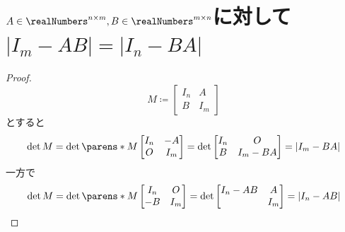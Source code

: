     \section{\texorpdfstring{$A\in\realNumbers^{n\times m}, B\in\realNumbers^{m\times n}$}{A∈R\string^(n×m), B∈R\string^(m×n)}に対して\texorpdfstring{$|I_m-AB| = |I_n-BA|$}{|Im-AB| = |In-BA|}}
        \label{I-ABの行列式}
        \begin{proof}
            \[
                M \coloneq \begin{bmatrix}
                    I_n & A \\
                    B & I_m
                \end{bmatrix}
            \]
            とすると
            \[
                \det{M} = \det{
                    \parens*{M
                    \begin{bmatrix}
                        I_n & -A \\
                        O & I_m
                    \end{bmatrix}
                    }
                } = \det{
                    \begin{bmatrix}
                        I_n & O \\
                        B & I_m-BA
                    \end{bmatrix}
                } = |I_m-BA|
            \]
            一方で
            \[
                \det{M} = \det{
                    \parens*{M
                    \begin{bmatrix}
                        I_n & O \\
                        -B & I_m
                    \end{bmatrix}
                    }
                } = \det{
                    \begin{bmatrix}
                        I_n-AB & A \\
                        ~ & I_m
                    \end{bmatrix}
                } = |I_n-AB|
            \]
        \end{proof}

